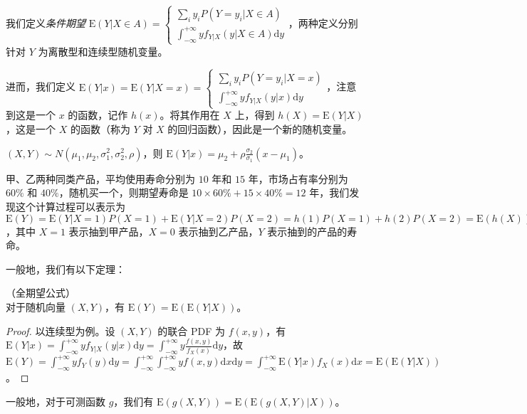 \documentclass[../main.tex]{subfiles}
\begin{document}
我们定义\emph{条件期望} $\mathrm E(Y|X\in A)=\left\{
\begin{aligned}
\sum_iy_iP(Y=y_i|X\in A)\\
\int_{-\infty}^{+\infty}yf_{Y|X}(y|X\in A)\mathrm dy
\end{aligned}$，两种定义分别针对 $Y$ 为离散型和连续型随机变量。

进而，我们定义 $\mathrm E(Y|x)=\mathrm E(Y|X=x)=\left\{
\begin{aligned}
\sum_iy_iP(Y=y_i|X=x)\\
\int_{-\infty}^{+\infty}yf_{Y|X}(y|x)\mathrm dy
\end{aligned}
$，注意到这是一个 $x$ 的函数，记作 $h(x)$。将其作用在 $X$ 上，得到 $h(X)=\mathrm E(Y|X)$，这是一个 $X$ 的函数（称为 $Y$ 对 $X$ 的回归函数），因此是一个新的随机变量。

\begin{example}
$(X,Y)\sim N(\mu_1,\mu_2,\sigma_1^2,\sigma_2^2,\rho)$，则 $\mathrm E(Y|x)=\mu_2+\rho\frac{\sigma_2}{\sigma_1}(x-\mu_1)$。
\end{example}

\begin{example}
甲、乙两种同类产品，平均使用寿命分别为 $10$ 年和 $15$ 年，市场占有率分别为 $60\%$ 和 $40\%$，随机买一个，则期望寿命是 $10\times 60\%+15\times 40\%=12$ 年，我们发现这个计算过程可以表示为 $\mathrm E(Y)=\mathrm E(Y|X=1)P(X=1)+\mathrm E(Y|X=2)P(X=2)=h(1)P(X=1)+h(2)P(X=2)=\mathrm E(h(X))=\mathrm E(\mathrm E(Y|X))$，其中 $X=1$ 表示抽到甲产品，$X=0$ 表示抽到乙产品，$Y$ 表示抽到的产品的寿命。
\end{example}

一般地，我们有以下定理：

\begin{theorem}\label{thm:4.7.1}
（全期望公式）\\
对于随机向量 $(X,Y)$，有 $\mathrm E(Y)=\mathrm E(\mathrm E(Y|X))$。
\end{theorem}

\begin{proof}
以连续型为例。设 $(X,Y)$ 的联合 PDF 为 $f(x,y)$，有 $\mathrm E(Y|x)=\int_{-\infty}^{+\infty}yf_{Y|X}(y|x)\mathrm dy=\int_{-\infty}^{+\infty}y\frac{f(x,y)}{f_X(x)}\mathrm dy$，故 $\mathrm E(Y)=\int_{-\infty}^{+\infty}yf_Y(y)\mathrm dy=\int_{-\infty}^{+\infty}\int_{-\infty}^{+\infty}yf(x,y)\mathrm dx\mathrm dy=\int_{-\infty}^{+\infty}\mathrm E(Y|x)f_X(x)\mathrm dx=\mathrm E(\mathrm E(Y|X))$。
\end{proof}

一般地，对于可测函数 $g$，我们有 $\mathrm E(g(X,Y))=\mathrm E(\mathrm E(g(X,Y)|X))$。
\end{document}
